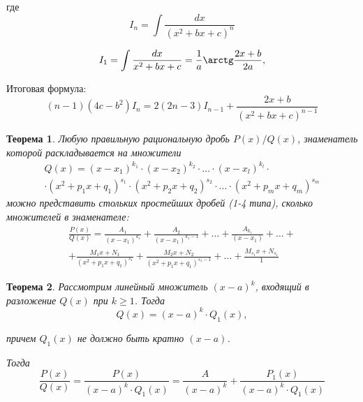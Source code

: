 \documentclass[a4paper,12pt,oneside]{extbook}
\theoremstyle{numbered}
\theoremstyle{unnumbered}
\theoremstyle{named}
\newtheorem{theorem}{Теорема}[section]
\theoremstyle{unnumbered}
\theoremstyle{named}
\theoremstyle{named}
\theoremstyle{named}
\begin{document}
где
\begin{equation}
    I_n = \int \frac{dx}{(x^2 + bx + c)^n}
\end{equation}

\begin{equation}
    I_1 = \int \frac{dx}{x^2 + bx + c} = \frac{1}{a} \arctg \frac{2x + b}{2a},
\end{equation}

Итоговая формула:
\begin{equation}
    (n - 1)(4c - b^2) I_n = 2(2n - 3)I_{n - 1} + \frac{2x + b}{(x^2 + bx + c)^{n - 1}}
\end{equation}

\begin{theorem}
    Любую правильную рациональную дробь \(P(x) / Q(x)\), знаменатель которой раскладывается на множители
    \begin{equation}
        \begin{gathered}
            Q(x) = (x - x_1)^{k_1} \cdot (x - x_2)^{k_2} \cdot \ldots \cdot (x - x_l)^{k_l} \cdot \\
            \cdot (x^2 + p_1x + q_1)^{s_1} \cdot (x^2 + p_2x + q_2)^{s_2} \cdot \ldots \cdot (x^2 + p_mx + q_m)^{s_m}
        \end{gathered}
    \end{equation}
    можно представить стольких простейших дробей (1-4 типа), сколько множителей в знаменателе:
    \begin{gather*}
        \frac{P(x)}{Q(x)} = \frac{A_1}{(x - x_1)^{k_1}} + \frac{A_2}{(x - x_1)^{k_1 - 1}} + \ldots + \frac{A_{k_1}}{(x - x_1)} + \ldots + \\
        + \frac{M_1x + N_1}{(x^2 + p_1x + q_1)^{s_1}} + \frac{M_2x + N_2}{(x^2 + p_1x + q_1)^{s_1 - 1}} + \ldots +  \frac{M_{s_1}x + N_{s_1}}{1}
    \end{gather*}
\end{theorem}


\begin{theorem}
    Рассмотрим линейный множитель \((x - a)^k\), входящий в разложение \(Q(x)\) при \(k \geq 1\). Тогда
    \[
        Q(x) = (x - a)^k \cdot Q_1(x),
    \]

    причем \(Q_1(x)\) не должно быть кратно \((x - a)\).

    Тогда
    \[
        \frac{P(x)}{Q(x)} = \frac{P(x)}{(x - a)^k \cdot Q_1(x)} = \frac{A}{(x - a)^k} + \frac{P_1(x)}{(x - a)^k \cdot Q_1(x)}
    \]
\end{theorem}
\end{document}
